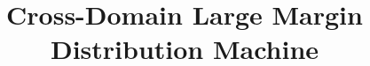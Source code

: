 \documentclass[a4paper]{cas-sc}
\begin{document}
\let\WriteBookmarks\relax
\def\floatpagepagefraction{1}
\def\textpagefraction{.001}


\title [mode = title]{Cross-Domain Large Margin Distribution Machine}










\end{document}
